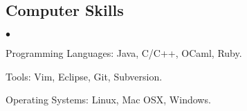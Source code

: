 \documentclass[margin,line]{res}
\newenvironment{list2}{
  \begin{list}{$\bullet$}{%
      \setlength{\itemsep}{0in}
      \setlength{\parsep}{0in} \setlength{\parskip}{0in}
      \setlength{\topsep}{0in} \setlength{\partopsep}{0in} 
      \setlength{\leftmargin}{0.2in}}}{\end{list}}
\begin{document}
\begin{resume}
\section{\sc Computer Skills} 
\begin{list2}
\item Programming Languages: Java, C/C++, OCaml, Ruby.
\item Tools: Vim, Eclipse, Git, Subversion.
\item Operating Systems: Linux, Mac OSX, Windows.
\end{list2}



\end{resume}
\end{document}
